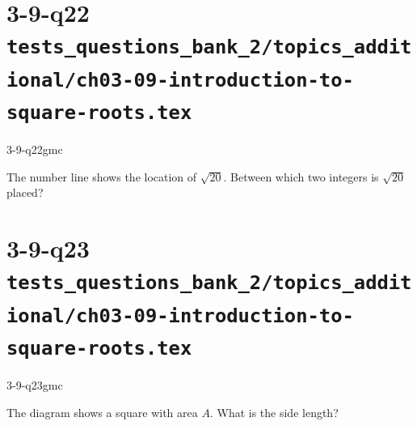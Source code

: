 \documentclass[12pt, fleqn, openany]{studyGuide}
\begin{document}
\newpage
\section*{3-9-q22 \hfill \normalsize\texttt{tests\_questions\_bank\_2/topics\_additional/ch03-09-introduction-to-square-roots.tex}}
\begin{practiceQuestion}{3-9-q22}{gmc}
\begin{questionText}
The number line shows the location of $\sqrt{20}$. Between which two integers is $\sqrt{20}$ placed?

\begin{center}
\end{center}
\end{questionText}
\end{practiceQuestion}

\newpage
\section*{3-9-q23 \hfill \normalsize\texttt{tests\_questions\_bank\_2/topics\_additional/ch03-09-introduction-to-square-roots.tex}}
\begin{practiceQuestion}{3-9-q23}{gmc}
\begin{questionText}
The diagram shows a square with area $A$. What is the side length?

\begin{center}
\end{center}
\end{questionText}
\end{practiceQuestion}
\end{document}
